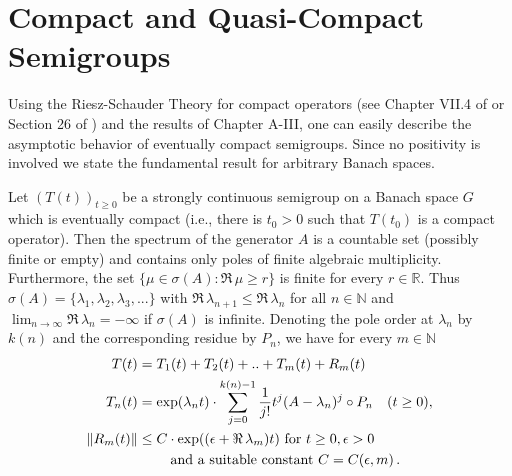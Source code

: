 \section{Compact and Quasi-Compact Semigroups}

Using the Riesz-Schauder Theory for compact operators (see \eg
Chapter VII.4 of \citet{dunfordschwartz:1958} or Section 26 of \citet{pietsch:1978}) and the results of Chapter A-III, one can easily describe the
asymptotic behavior of eventually compact semigroups.
Since no positivity is involved we state the fundamental result for arbitrary Banach
spaces.

\begin{theorem}\label{thm:b4-2.1}
	Let $(T(t))_{t \geq 0}$ be a strongly continuous semigroup on a
	Banach space $G$ which is eventually compact (i.e., there is $t_{0} > 0$
	such that $T(t_{0})$ is a compact operator).
	Then the spectrum of the
	generator $A$ is a countable set (possibly finite or empty) and
	contains only poles of finite algebraic multiplicity.
	Furthermore,
	the set $\{\mu \in \sigma(A) \colon \Re\,\mu \geq r\}$ is finite for every $r \in \mathbb{R}$.
	Thus
	$\sigma(A) = \{\lambda_1,\lambda_2,\lambda_3,... \}$ with $\Re\,\lambda_{n+1} \leq \Re\,\lambda_n$ for all $n \in \mathbb{N}$ and
	$\lim_{n \to \infty} \Re\,\lambda_n = -\infty$ if $\sigma(A)$ is infinite.
	Denoting the pole order at $\lambda_n$ by $k(n)$ and the corresponding residue
	by $P_n$, we have for every $m \in \mathbb{N}$
	\begin{equation}\label{eq:b4-2.1}
		\begin{aligned}
			T(t) &= T_1(t) + T_2(t) + .. + T_m(t) + R_m(t)\\
			T_n(t) &= \exp(\lambda_n t) \cdot \sum_{j=0}^{k(n)-1} \frac{1}{j!}t^j(A - \lambda_n)^j \circ P_n \quad (t \geq 0),\\
			\|R_m(t)\| & \leq C \cdot \exp((\epsilon +\Re\, \lambda_m)t) \text{ for }  t \geq 0, \epsilon >0\\
			& \text{\phantom{aaaa} and a suitable	constant } C=C(\epsilon ,m)\,.
		\end{aligned}
	\end{equation}
\end{theorem}

